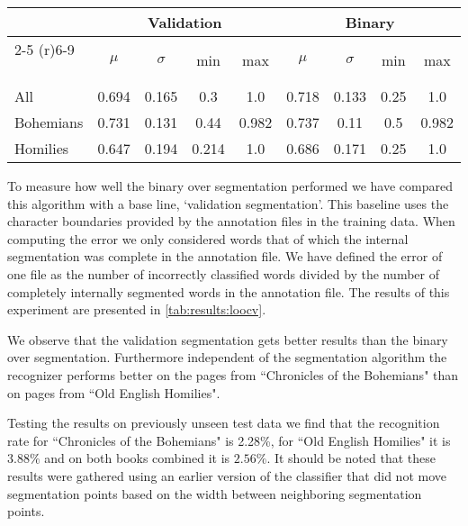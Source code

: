 
\begin{table*}[!t]
\caption{LOOCV results}
\label{tab:results:loocv}
\centering
	\begin{tabular}{lcccccccc}
		\toprule
					& \multicolumn{4}{c}{Validation} & \multicolumn{4}{c}{Binary}\\
					\cmidrule(r){2-5} \cmidrule(r){6-9}
		~ 			& $\mu$ 	& $\sigma$ 	& min 	& max 	& $\mu$ 	& $\sigma$ 	& min 	& max \\
		\midrule
		All 		& 0.694 	& 0.165 	& 0.3 	& 1.0 	& 0.718 	& 0.133 	& 0.25 	& 1.0 \\
		Bohemians 	& 0.731 	& 0.131 	& 0.44 	& 0.982 & 0.737 	& 0.11 		& 0.5 	& 0.982 \\
		Homilies 	& 0.647 	& 0.194 	& 0.214 & 1.0 	& 0.686 	& 0.171 	& 0.25 	& 1.0 \\
		\bottomrule
	\end{tabular}
\end{table*}

To measure how well the binary over segmentation performed we have compared this algorithm with a base line, `validation segmentation'. This baseline uses the character boundaries provided by the annotation files in the training data. When computing the error we only considered words that of which the internal segmentation was complete in the annotation file. We have defined the error of one file as the number of incorrectly classified words divided by the number of completely internally segmented words in the annotation file.  The results of this experiment are presented in \cref{tab:results:loocv}. 

We observe that the validation segmentation gets better results than the binary over segmentation. Furthermore independent of the segmentation algorithm the recognizer performs better on the pages from ``Chronicles of the Bohemians" than on pages from ``Old English Homilies".

Testing the results on previously unseen test data we find that the recognition rate for ``Chronicles of the Bohemians" is 2.28\%, for ``Old English Homilies" it is $3.88\%$ and on both books combined it is $2.56\%$. It should be noted that these results were gathered using an earlier version of the classifier that did not move segmentation points based on the width between neighboring segmentation points.